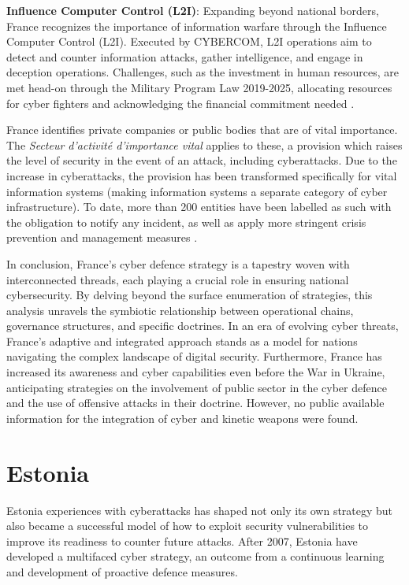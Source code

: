 \textbf{Influence Computer Control (L2I)}: Expanding beyond national borders, France recognizes the importance of information warfare through the Influence Computer Control (L2I). Executed by CYBERCOM, L2I operations aim to detect and counter information attacks, gather intelligence, and engage in deception operations. Challenges, such as the investment in human resources, are met head-on through the Military Program Law 2019-2025, allocating resources for cyber fighters and acknowledging the financial commitment needed \autocite{ministredesarmes_2021_lments}.

France identifies private companies or public bodies that are of vital importance. The \textit{Secteur d'activité d'importance vital} applies to these, a provision which raises the level of security in the event of an attack, including cyberattacks. Due to the increase in cyberattacks, the provision has been transformed specifically for vital information systems (making information systems a separate category of cyber infrastructure). To date, more than 200 entities have been labelled as such with the obligation to notify any incident, as well as apply more stringent crisis prevention and management measures \autocite{anssi_2022_le}.

In conclusion, France's cyber defence strategy is a tapestry woven with interconnected threads, each playing a crucial role in ensuring national cybersecurity. By delving beyond the surface enumeration of strategies, this analysis unravels the symbiotic relationship between operational chains, governance structures, and specific doctrines. In an era of evolving cyber threats, France's adaptive and integrated approach stands as a model for nations navigating the complex landscape of digital security. Furthermore, France has increased its awareness and cyber capabilities even before the War in Ukraine, anticipating strategies on the involvement of public sector in the cyber defence and the use of offensive attacks in their doctrine. However, no public available information for the integration of cyber and kinetic weapons were found. 

\section{Estonia}
Estonia experiences with cyberattacks has shaped not only its own strategy but also became a successful model of how to exploit security vulnerabilities to improve its readiness to counter future attacks. After 2007, Estonia have developed a multifaced cyber strategy, an outcome from a continuous learning and development of proactive defence measures. 

